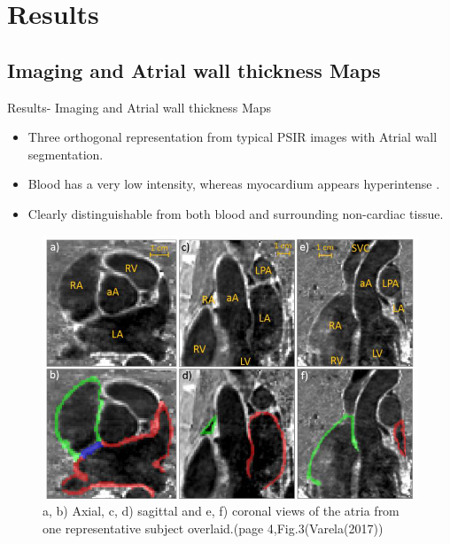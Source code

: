\documentclass[aspectratio=43]{beamer}
\begin{document}
\newpage
\section{Results}
\subsection{Imaging and Atrial wall thickness Maps}
\begin{frame}{Results- Imaging and Atrial wall thickness Maps}
\begin{minipage}{0.5\textwidth}\raggedleft
\begin{itemize}

\item Three orthogonal representation from typical PSIR images with Atrial wall segmentation.
        \item Blood has a very low intensity, whereas myocardium appears hyperintense .
          
        \item Clearly distinguishable from both blood and surrounding non-cardiac tissue.
        
\end{itemize}
\end{minipage}
\begin{minipage}{0.5\textwidth}\raggedleft
\begin{figure}[h!]


\includegraphics[width=\linewidth]{img/img4}

\caption {a, b) Axial, c, d) sagittal and e, f) coronal views of the atria from one representative subject overlaid.(page 4,Fig.3(Varela(2017))}
\end{figure}
\end{minipage}

\noindent



\end{frame}
\end{document}
